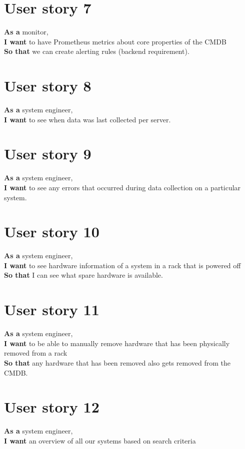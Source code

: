 \documentclass{article}
\begin{document}
\section{User story 7}
\textbf{As a} monitor,
\\\textbf{I want} to have Prometheus metrics about core properties of the CMDB
\\\textbf{So that} we can create alerting rules (backend requirement).

\section{User story 8}
\textbf{As a} system engineer,
\\\textbf{I want} to see when data was last collected per server.

\section{User story 9}
\textbf{As a} system engineer,
\\\textbf{I want} to see any errors that occurred during data collection on a particular system.

\section{User story 10}
\textbf{As a} system engineer,
\\\textbf{I want} to see hardware information of a system in a rack that is powered off
\\\textbf{So that} I can see what spare hardware is available.

\section{User story 11}
\textbf{As a} system engineer,
\\\textbf{I want} to be able to manually remove hardware that has been physically removed from a rack
\\\textbf{So that} any hardware that has been removed also gets removed from the CMDB.

\section{User story 12}
\textbf{As a} system engineer,
\\\textbf{I want} an overview of all our systems based on search criteria
\end{document}
